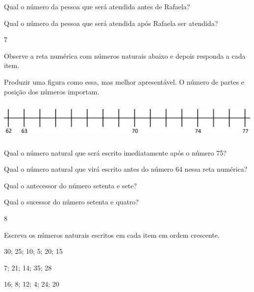 \begin{escolha}

\item
  Qual o número da pessoa que será atendida antes de Rafaela?

\item
  Qual o número da pessoa que será atendida após Rafaela ser atendida?

\end{escolha}

\num{7}

Observe a reta numérica com números naturais abaixo e depois responda a
cada item.

Produzir uma figura como essa, mas melhor apresentável. O número de
partes e posição dos números importam.

\includegraphics[width=5.22545in,height=0.75840in]{media/image31.png}

\begin{escolha}

\item
  Qual o número natural que será escrito imediatamente após o número 75?

\item
  Qual o número natural que virá escrito antes do número 64 nessa reta
  numérica?

\item
  Qual o antecessor do número setenta e sete?

\item
  Qual o sucessor do número setenta e quatro?

\end{escolha}

\num{8}

Escreva os números naturais escritos em cada item em ordem crescente.

\begin{escolha}

\item
  30; 25; 10; 5; 20; 15

\item
  7; 21; 14; 35; 28

\item
  16; 8; 12; 4; 24; 20

\end{escolha}

